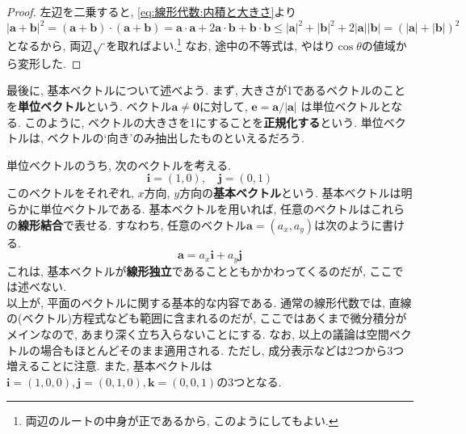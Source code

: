 \documentclass[a4j,dvipdfmx]{jsarticle}
\numberwithin{equation}{section}
\begin{document}
            \begin{proof}
                左辺を二乗すると, \eqref{eq:線形代数:内積と大きさ}より
                \begin{equation*}
                    |\bm{a}+\bm{b}|^2 = (\bm{a}+\bm{b})\cdot (\bm{a}+\bm{b})=\bm{a}\cdot\bm{a} + 2\bm{a}\cdot\bm{b}+\bm{b}\cdot\bm{b}\leq|\bm{a}|^2+|\bm{b}|^2+2|\bm{a}||\bm{b}|=(|\bm{a}|+|\bm{b}|)^2
                \end{equation*}
                となるから, 両辺$\sqrt{\hspace{1mm}}$を取ればよい.\footnote{両辺のルートの中身が正であるから, このようにしてもよい.} なお, 途中の不等式は, やはり$\cos\theta$の値域から変形した.
            \end{proof}

            最後に, 基本ベクトルについて述べよう. まず, 大きさが1であるベクトルのことを\textbf{単位ベクトル}という. ベクトル$\bm{a}\neq\bm{0}$に対して, $\bm{e}=\bm{a}/|\bm{a}|$
            は単位ベクトルとなる. このように, ベクトルの大きさを1にすることを\textbf{正規化する}という. 単位ベクトルは, ベクトルの`向き'のみ抽出したものといえるだろう.
            
            単位ベクトルのうち, 次のベクトルを考える.
            \begin{equation}
                \bm{i}=(1,0),\quad \bm{j}=(0,1) \label{eq:線形代数:平面の基本ベクトル}
            \end{equation}
            このベクトルをそれぞれ, $x$方向, $y$方向の\textbf{基本ベクトル}という. 基本ベクトルは明らかに単位ベクトルである.
            基本ベクトルを用いれば, 任意のベクトルはこれらの\textbf{線形結合}で表せる. すなわち, 任意のベクトル$\bm{a}=(a_x,a_y)$は次のように書ける.
            \begin{equation}
                \bm{a}=a_x\bm{i}+a_y\bm{j} \label{eq:線形代数:基本ベクトルの線形結合}
            \end{equation}
            これは, 基本ベクトルが\textbf{線形独立}であることともかかわってくるのだが, ここでは述べない.\\

            以上が, 平面のベクトルに関する基本的な内容である. 通常の線形代数では, 直線の(ベクトル)方程式なども範囲に含まれるのだが, ここではあくまで微分積分がメインなので, あまり深く立ち入らないことにする. 
            なお, 以上の議論は空間ベクトルの場合もほとんどそのまま適用される. ただし, 成分表示などは2つから3つ増えることに注意. また, 基本ベクトルは$\bm{i}=(1,0,0),\bm{j}=(0,1,0),\bm{k}=(0,0,1)$の3つとなる.
\end{document}
